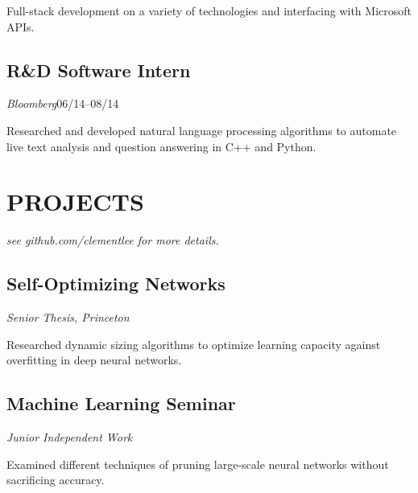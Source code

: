 \documentclass[11pt]{article}
\begin{document}
\begin{minipage}[t]{0.55\textwidth}
  Full-stack development on a variety of technologies and interfacing with Microsoft APIs.

  \medskip
  \subsection*{R\&D Software Intern}
  \emph{Bloomberg}\hfill 06/14--08/14
  \smallskip

  Researched and developed natural language processing algorithms to automate live text analysis and question answering in C++ and Python.

  \bigskip
  \section*{\LARGE PROJECTS}
  \emph{see github.com/clementlee for more details.}
  \medskip
  
  \medskip
  \subsection*{Self-Optimizing Networks}
  \emph{Senior Thesis, Princeton}
  \smallskip

  Researched dynamic sizing algorithms to optimize learning capacity against overfitting in deep neural networks.

  \medskip
  \subsection*{Machine Learning Seminar}
  \emph{Junior Independent Work}
  \smallskip

  Examined different techniques of pruning large-scale neural networks without sacrificing accuracy.
  

  
\end{minipage}
\end{document}
